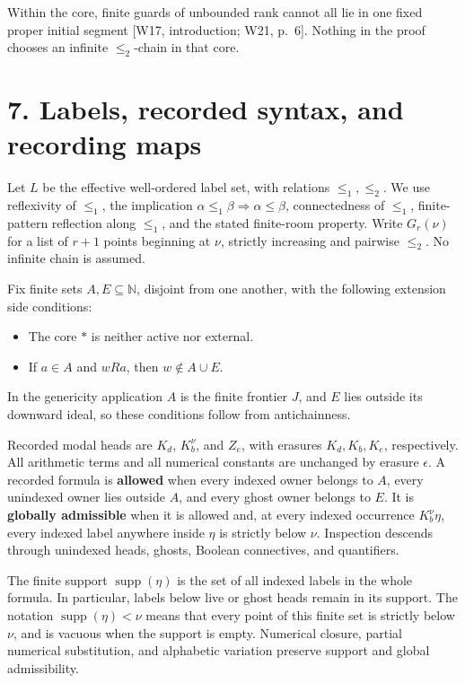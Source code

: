 \documentclass[
  11pt,
  letterpaper,
]{article}
\providecommand{\tightlist}{%
  \setlength{\itemsep}{0pt}\setlength{\parskip}{0pt}}
\begin{document}
Within the core, finite guards of unbounded rank cannot all lie in one
fixed proper initial segment {[}W17, introduction; W21, p.~6{]}. Nothing
in the proof chooses an infinite \(\leq_2\)-chain in that core.

\section{7. Labels, recorded syntax, and recording
maps}\label{labels-recorded-syntax-and-recording-maps}

Let \(L\) be the effective well-ordered label set, with relations
\(\leq_1,\leq_2\). We use reflexivity of \(\leq_1\), the implication
\(\alpha\leq_1\beta\Rightarrow\alpha\leq\beta\), connectedness of
\(\leq_1\), finite-pattern reflection along \(\leq_1\), and the stated
finite-room property. Write \(G_r(\nu)\) for a list of \(r+1\) points
beginning at \(\nu\), strictly increasing and pairwise \(\leq_2\). No
infinite chain is assumed.

Fix finite sets \(A,E\subseteq\mathbb N\), disjoint from one another,
with the following extension side conditions:

\begin{itemize}
\tightlist
\item
  The core \(*\) is neither active nor external.
\item
  If \(a\in A\) and \(wRa\), then \(w\notin A\cup E\).
\end{itemize}

In the genericity application \(A\) is the finite frontier \(J\), and
\(E\) lies outside its downward ideal, so these conditions follow from
antichainness.

Recorded modal heads are \(K_d\), \(K_b^\nu\), and \(Z_e\), with
erasures \(K_d,K_b,K_e\), respectively. All arithmetic terms and all
numerical constants are unchanged by erasure \(\epsilon\). A recorded
formula is \textbf{allowed} when every indexed owner belongs to \(A\),
every unindexed owner lies outside \(A\), and every ghost owner belongs
to \(E\). It is \textbf{globally admissible} when it is allowed and, at
every indexed occurrence \(K_b^\nu\eta\), every indexed label anywhere
inside \(\eta\) is strictly below \(\nu\). Inspection descends through
unindexed heads, ghosts, Boolean connectives, and quantifiers.

The finite support \(\operatorname{supp}(\eta)\) is the set of all
indexed labels in the whole formula. In particular, labels below live or
ghost heads remain in its support. The notation
\(\operatorname{supp}(\eta)<\nu\) means that every point of this finite
set is strictly below \(\nu\), and is vacuous when the support is empty.
Numerical closure, partial numerical substitution, and alphabetic
variation preserve support and global admissibility.
\end{document}
